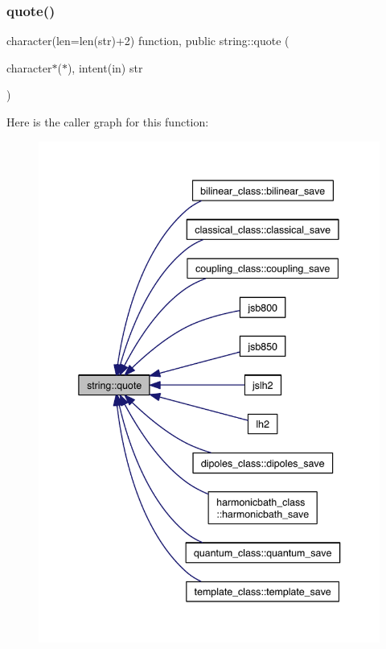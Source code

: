 \subsubsection{\texorpdfstring{quote()}{quote()}}
{\footnotesize\ttfamily character(len=len(str)+2) function, public string\+::quote (\begin{DoxyParamCaption}\item[{character$\ast$($\ast$), intent(in)}]{str }\end{DoxyParamCaption})}

Here is the caller graph for this function\+:\nopagebreak
\begin{figure}[H]
\begin{center}
\leavevmode
\includegraphics[width=342pt]{namespacestring_a43ac41bc9fa839e5e40ec725c029b5a4_icgraph}
\end{center}
\end{figure}
\mbox{\label{namespacestring_ac3e429fd86c78765b2408096ae132f8a}} 
